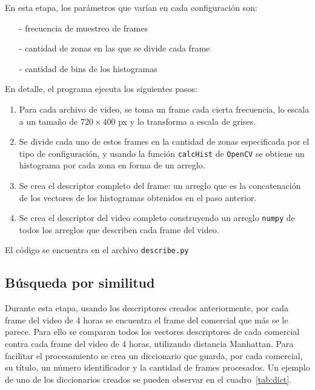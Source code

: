 \documentclass[14pt,letterpaper,hidelinks]{extarticle}
\begin{document}
En esta etapa, los parámetros que varían en cada configuración son:
\begin{itemize}
\item[-] frecuencia de muestreo de frames
\item[-] cantidad de zonas en las que se divide cada frame
\item[-] cantidad de bins de los histogramas 
\end{itemize}

En detalle, el programa ejecuta los siguientes pasos:
\begin{enumerate}
\item Para cada archivo de video, se toma un frame cada cierta frecuencia, lo escala a un tamaño de $720\times400$ px y lo transforma a escala de grises.
\item Se divide cada uno de estos frames en la cantidad de zonas especificada por el tipo de configuración, y usando la función \verb+calcHist+ de \verb+OpenCV+ se obtiene un histograma por cada zona en forma de un arreglo.
\item Se crea el descriptor completo del frame: un arreglo que es la concatenación de los vectores de los histogramas obtenidos en el paso anterior.
\item Se crea el descriptor del video completo construyendo un arreglo \verb+numpy+ de todos los arreglos que describen cada frame del video.
\end{enumerate}

El código se encuentra en el archivo \verb+describe.py+

\subsection{Búsqueda por similitud}
Durante esta etapa, usando los descriptores creados anteriormente, por cada frame del video de 4 horas se encuentra el frame del comercial que más se le parece. Para ello se comparan todos los vectores descriptores de cada comercial contra cada frame del video de 4 horas, utilizando distancia Manhattan. Para facilitar el procesamiento se crea un diccionario que guarda, por cada comercial, su título, un número identificador y la cantidad de frames procesados. Un ejemplo de uno de los diccionarios creados se pueden observar en el cuadro~\ref{tab:dict}.\\
\end{document}
